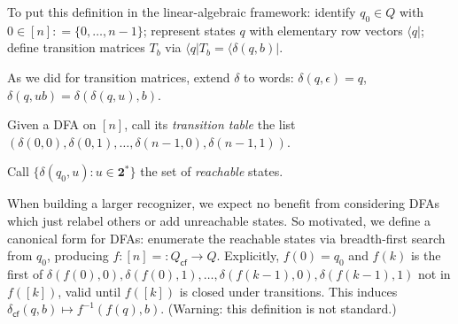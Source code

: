 To put this definition in the linear-algebraic framework:
identify $q_0\in Q$ with $0\in [n]\mathrel{\mathop:}=\{0,\ldots,n-1\}$;
represent states $q$ with elementary row vectors $\langle q\vert$;
define transition matrices $T_b$ via $\langle q\vert T_b = \langle \delta(q, b)\vert$.

As we did for transition matrices, extend $\delta$ to words: $\delta(q,\epsilon)=q$, $\delta(q,ub)=\delta(\delta(q,u),b)$.

Given a DFA on $[n]$, call its \emph{transition table} the list $(\delta(0,0),\delta(0,1),\ldots,\delta(n-1,0),\delta(n-1,1))$.

Call $\{\delta(q_0,u): u\in\mathbf{2}^*\}$ the set of \emph{reachable} states.

When building a larger recognizer,
we expect no benefit from considering DFAs which just relabel others or add unreachable states.
So motivated, we define a canonical form for DFAs:
enumerate the reachable states via breadth-first search from $q_0$,
producing $f:[n]=\mathrel{\mathop:}Q_\textsf{cf}\to Q$.
Explicitly,
 $f(0)=q_0$ and $f(k)$ is the first of
 $\delta(f(0),0), \delta(f(0),1), \ldots, \delta(f(k-1),0), \delta(f(k-1),1)$ not in $f([k])$,
 valid until $f([k])$ is closed under transitions.
This induces $\delta_\textsf{cf}(q,b)\mapsto f^{-1}(f(q), b)$.
(Warning: this definition is not standard.)

